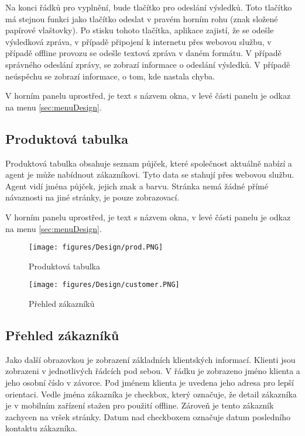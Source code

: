 \documentclass[11pt,twoside,a4paper]{book}
\begin{document}
Na konci řádků pro vyplnění, bude tlačítko pro odeslání výsledků. Toto tlačítko má stejnou funkci jako tlačítko odeslat v pravém horním rohu (znak složené papírové vlaštovky). Po stisku tohoto tlačítka, aplikace zajistí, že se odešle výsledková zpráva, v případě připojení k internetu přes webovou službu, v případě offline provozu se odešle textová zpráva v daném formátu. V případě správného odeslání zprávy, se zobrazí informace o odeslání výsledků. V případě neúspěchu se zobrazí informace, o tom, kde nastala chyba.

V horním panelu uprostřed, je text s názvem okna, v levé části panelu je odkaz na menu \ref{sec:menuDesign}.

\subsection{Produktová tabulka}
Produktová tabulka obsahuje seznam půjček, které společnost aktuálně nabízí a agent je může nabídnout zákazníkovi. Tyto data se stahují přes webovou službu. Agent vidí jména půjček, jejich znak a barvu. Stránka nemá žádné přímé návaznosti na jiné stránky, je pouze zobrazovací.

V horním panelu uprostřed, je text s názvem okna, v levé části panelu je odkaz na menu \ref{sec:menuDesign}.

\begin{figure}[H]
	\centering
	\texttt{[image: figures/Design/prod.PNG]}
	\caption{Produktová tabulka}
	\label{fig:productscreens}
	\end{figure}

\begin{wrapfigure}[15]{r}{0.2\textwidth}
	\centering
	\texttt{[image: figures/Design/customer.PNG]}
	\caption{Přehled zákazníků}
	\label{fig:customerscreens}
	\end{wrapfigure}
	
\subsection{Přehled zákazníků} \label{sec:customerDesign}
Jako další obrazovkou je zobrazení základních klientských informací. Klienti jsou zobrazeni v jednotlivých řádcích pod sebou. V řádku je zobrazeno jméno klienta a jeho osobní číslo v závorce. Pod jménem klienta je uvedena jeho adresa pro lepší orientaci. Vedle jména zákazníka je checkbox, který označuje, že detail zákazníka je v mobilním zařízení stažen pro použití offline. Zároveň je tento zákazník zachycen na vršek stránky. Datum nad checkboxem označuje datum posledního kontaktu zákazníka.
\end{document}
